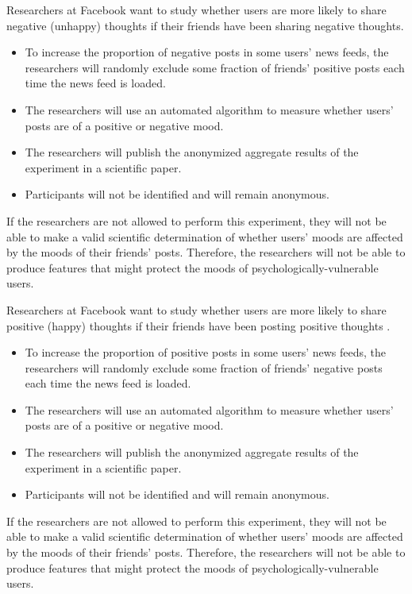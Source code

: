 Researchers at Facebook want to study whether users are more likely to share negative (unhappy) thoughts if their friends have been sharing negative thoughts.
\begin{itemize}
 \item To increase the proportion of negative posts in some users' news feeds, the researchers will randomly exclude some fraction of friends' positive posts each time the news feed is loaded.
\item The researchers will use an automated algorithm to measure whether users' posts are of a positive or negative mood.
\item The researchers will publish the anonymized aggregate results of the experiment in a scientific paper.
\item Participants will not be identified and will remain anonymous.
\end{itemize}
If the researchers are not allowed to perform this experiment, they will not be able to make a valid scientific determination of whether users' moods are affected by the moods of their friends' posts. Therefore, the researchers will not be able to produce features that might protect the moods of psychologically-vulnerable users.




Researchers at Facebook want to study whether users are more likely to share positive (happy) thoughts if their friends have been posting positive thoughts .
\begin{itemize}
\item To increase the proportion of positive posts in some users' news feeds, the researchers will randomly exclude some fraction of friends' negative posts each time the news feed is loaded.
 \item The researchers will use an automated algorithm to measure whether users' posts are of a positive or negative mood.
\item The researchers will publish the anonymized aggregate results of the experiment in a scientific paper.
\item Participants will not be identified and will remain anonymous.
\end{itemize}
If the researchers are not allowed to perform this experiment, they will not be able to make a valid scientific determination of whether users' moods are affected by the moods of their friends' posts. Therefore, the researchers will not be able to produce features that might protect the moods of psychologically-vulnerable users.




